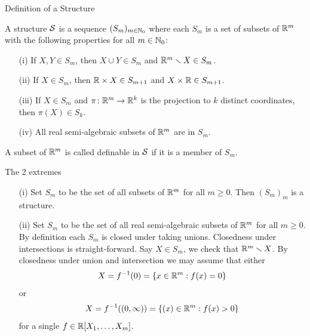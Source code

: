 \documentclass{beamer}
\begin{document}
\begin{frame}{Definition of a Structure}
  \begin{definition}
    A \alert{structure} ${\mathcal S}$ is a sequence $(S_m)_{m\in{\mathbb{N}}_0}$
    where each $S_m$ is a set of subsets of ${\mathbb{R}}^m$ with the following
    properties for all $m\in {\mathbb{N}}_0$:
    \begin{enumerate}
    \item [(i)] If $X,Y\in S_m$, then $X\cup Y\in S_m$ and
      ${\mathbb{R}}^m\smallsetminus X\in S_m$.
    \item[(ii)] If $X\in S_m$, then ${\mathbb{R}}\times X\in S_{m+1}$ and $X\times
      {\mathbb{R}}\in S_{m+1}$.
    \item[(iii)] If $X\in S_{m}$ and $\pi\colon
      {\mathbb{R}}^{m}\rightarrow{\mathbb{R}}^k$ is the projection to $k$ distinct
      coordinates, then 
      $\pi(X)\in S_k$.
    \item[(iv)] All real semi-algebraic subsets of ${\mathbb{R}}^m$ are in
      $S_m$.
    \end{enumerate}
    A subset of  ${\mathbb{R}}^m$ is called \alert{definable} in ${\mathcal S}$ if it
    is a member of $S_m$.
  \end{definition}

\end{frame}

\begin{frame}{The 2 extremes}
  \begin{example}
    \begin{enumerate}
    \item [(i)] Set $S_m$ to be the set of all subsets of ${\mathbb{R}}^m$ for
      all $m\ge 0$. Then $(S_m)_m$ is a structure. 
    \item[(ii)]
      Set $S_m$ to be the set of all real semi-algebraic subsets of ${\mathbb{R}}^m$
      for all $m\ge 0$. By definition each $S_m$ is closed under taking
      unions. Closedness under intersections is straight-forward. 
      Say $X\in S_m$, we check that ${\mathbb{R}}^m \smallsetminus X$. 
      By closedness under union and intersection we may assume that either 
      \begin{equation*}
        X = f^{-1}(0)=\{ x\in{\mathbb{R}}^m : f(x) = 0\}
      \end{equation*}
      or
      \begin{equation*}     
        X = f^{-1}((0,\infty))=\{ (x)\in{\mathbb{R}}^m : f(x) > 0\}
      \end{equation*}
      for a single $f\in{\mathbb{R}}[X_1,\ldots,X_m]$.
    \end{enumerate}
  \end{example}

\end{frame}
\end{document}
